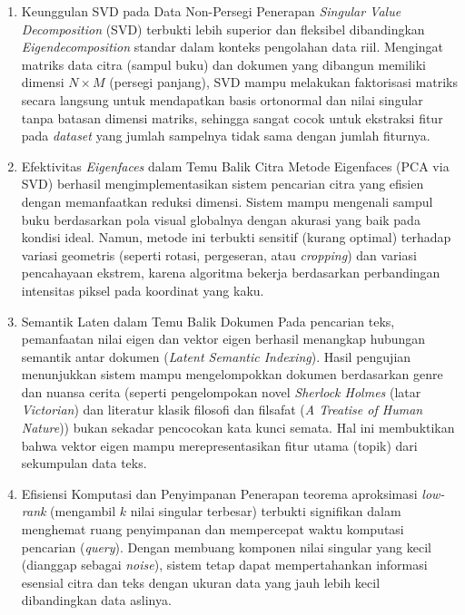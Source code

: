 \documentclass[12pt,a4paper]{article}
\begin{document}
\begin{enumerate}
    \item Keunggulan SVD pada Data Non-Persegi Penerapan \textit{Singular Value Decomposition} (SVD) terbukti lebih superior dan fleksibel dibandingkan \textit{Eigendecomposition} standar dalam konteks pengolahan data riil. Mengingat matriks data citra (sampul buku) dan dokumen yang dibangun memiliki dimensi $N \times M$ (persegi panjang), SVD mampu melakukan faktorisasi matriks secara langsung untuk mendapatkan basis ortonormal dan nilai singular tanpa batasan dimensi matriks, sehingga sangat cocok untuk ekstraksi fitur pada \textit{dataset} yang jumlah sampelnya tidak sama dengan jumlah fiturnya.
    \item Efektivitas \textit{Eigenfaces} dalam Temu Balik Citra Metode Eigenfaces (PCA via SVD) berhasil mengimplementasikan sistem pencarian citra yang efisien dengan memanfaatkan reduksi dimensi. Sistem mampu mengenali sampul buku berdasarkan pola visual globalnya dengan akurasi yang baik pada kondisi ideal. Namun, metode ini terbukti sensitif (kurang optimal) terhadap variasi geometris (seperti rotasi, pergeseran, atau \textit{cropping}) dan variasi pencahayaan ekstrem, karena algoritma bekerja berdasarkan perbandingan intensitas piksel pada koordinat yang kaku.
    \item Semantik Laten dalam Temu Balik Dokumen Pada pencarian teks, pemanfaatan nilai eigen dan vektor eigen berhasil menangkap hubungan semantik antar dokumen (\textit{Latent Semantic Indexing}). Hasil pengujian menunjukkan sistem mampu mengelompokkan dokumen berdasarkan genre dan nuansa cerita (seperti pengelompokan novel \textit{Sherlock Holmes} (latar \textit{Victorian}) dan literatur klasik filosofi dan filsafat (\textit{A Treatise of Human Nature})) bukan sekadar pencocokan kata kunci semata. Hal ini membuktikan bahwa vektor eigen mampu merepresentasikan fitur utama (topik) dari sekumpulan data teks.
    \item Efisiensi Komputasi dan Penyimpanan Penerapan teorema aproksimasi \textit{low-rank} (mengambil $k$ nilai singular terbesar) terbukti signifikan dalam menghemat ruang penyimpanan dan mempercepat waktu komputasi pencarian (\textit{query}). Dengan membuang komponen nilai singular yang kecil (dianggap sebagai \textit{noise}), sistem tetap dapat mempertahankan informasi esensial citra dan teks dengan ukuran data yang jauh lebih kecil dibandingkan data aslinya.
\end{enumerate}
\end{document}
